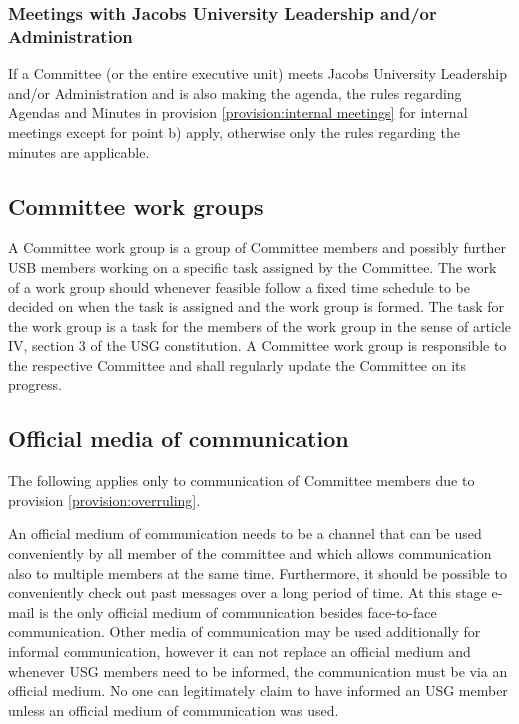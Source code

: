\subsubsection{Meetings with Jacobs University Leadership and/or Administration}
  If a Committee (or the entire executive unit) meets Jacobs University Leadership and/or Administration and is also making the agenda, the rules regarding Agendas and Minutes in provision \ref{provision:internal meetings} for internal meetings except for point b) apply, otherwise only the rules regarding the minutes are applicable. 

\subsection[Work groups]{Committee work groups}
A Committee work group is a group of Committee members and possibly further USB members working on a specific task assigned by the Committee. The work of a work group should whenever feasible follow a fixed time schedule to be decided on when the task is assigned and the work group is formed. The task for the work group is a task for the members of the work group in the sense of article IV, section 3 of the USG constitution. 
A Committee work group is responsible to the respective Committee and shall regularly update the Committee on its progress. %

\subsection{Official media of communication}
The following applies only to communication of Committee members due to provision \ref{provision:overruling}.

An official medium of communication needs to be a channel that can be used conveniently by all member of the committee and which allows communication also to multiple members at the same time. Furthermore, it should be possible to conveniently check out past messages over a long period of time. At this stage e-mail is the only official medium of communication besides face-to-face communication. 
Other media of communication may be used additionally for informal communication, however it can not replace an official medium and whenever USG members need to be informed, the communication must be via an official medium. No one can legitimately claim to have informed an USG member unless an official medium of communication was used. 

